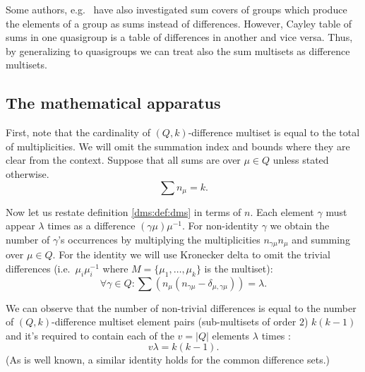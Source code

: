 \begin{remark}
    \label{dms:remark:abelian}
    Some authors, e.g.\ \cite{haanpaa2004minimum} have also investigated sum covers of groups which produce the elements of a group as sums instead of differences. However, Cayley table of sums in one quasigroup is a table of differences in another and vice versa. Thus, by generalizing to quasigroups we can treat also the sum multisets as difference multisets.
\end{remark}

\subsection{The mathematical apparatus}
    First, note that the cardinality of $(Q,k)$-difference multiset is equal to the total of multiplicities. We will omit the summation index and bounds where they are clear from the context. Suppose that all sums are over $\mu \in Q$ unless stated otherwise.
    \begin{equation}
        \label{apparatus:eq:ni}
        \sum {n_\mu} = k.
    \end{equation}
    
    Now let us restate definition \ref{dms:def:dms} in terms of $n$. Each element $\gamma$ must appear $\lambda$ times as a difference $(\gamma\mu)\mu^{-1}$. For non-identity $\gamma$ we obtain the number of $\gamma$'s occurrences by multiplying the multiplicities $n_{\gamma\mu} n_\mu$ and summing over $\mu \in Q$. For the identity we will use Kronecker delta to omit the trivial differences (i.e.\ $\mu_i\mu_i^{-1}$ where $M=\{\mu_1,\ldots,\mu_k\}$ is the multiset):
    \begin{equation}
        \label{apparatus:eq:system}
        \forall \gamma \in Q \colon \sum (n_\mu(n_{\gamma\mu}-\delta_{\mu,\gamma\mu})) = \lambda.
    \end{equation}
    
    We can observe that the number of non-trivial differences is equal to the number of $(Q,k)$-difference multiset element pairs (sub-multisets of order $2$) $k(k-1)$ and it's required to contain each of the $v=|Q|$ elements $\lambda$ times \cite{buratti1999old}:
    \begin{equation}
        \label{apparatus:eq:parameters}
        v\lambda = k(k-1).
    \end{equation}
(As is well known, a similar identity holds for the common difference sets.)
    
